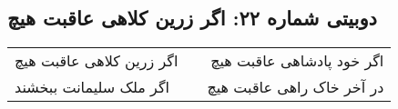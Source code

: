 \begin{center}
\section*{دوبیتی شماره ۲۲: اگر زرین کلاهی عاقبت هیچ}
\label{sec:022}
\begin{longtable}{l p{0.5cm} r}
اگر زرین کلاهی عاقبت هیچ
&&
اگر خود پادشاهی عاقبت هیچ
\\
اگر ملک سلیمانت ببخشند
&&
در آخر خاک راهی عاقبت هیچ
\\
\end{longtable}
\end{center}
